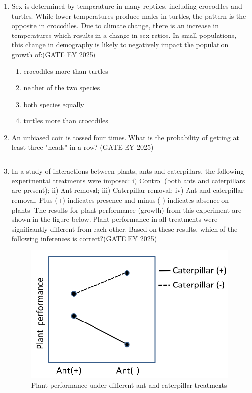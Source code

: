 \begin{enumerate}[leftmargin=*,label=\textbf{Q.\arabic*},resume]
\item Sex is determined by temperature in many reptiles, including crocodiles and turtles. While lower temperatures produce males in turtles, the pattern is the opposite in crocodiles. Due to climate change, there is an increase in temperatures which results in a change in sex ratios. In small populations, this change in demography is likely to negatively impact the population growth of:\hfill {(GATE EY 2025)}
\begin{multicols}{2}
\begin{enumerate}
\item crocodiles more than turtles
\item neither of the two species
\item both species equally
\item turtles more than crocodiles
\end{enumerate}
\end{multicols}

\item An unbiased coin is tossed four times. What is the probability of getting at least three "heads" in a row? \hfill {(GATE EY 2025)}

\rule{4cm}{0.15mm}

\item In a study of interactions between plants, ants and caterpillars, the following experimental treatments were imposed: i) Control (both ants and caterpillars are present); ii) Ant removal; iii) Caterpillar removal; iv) Ant and caterpillar removal. Plus (+) indicates presence and minus (-) indicates absence on plants. The results for plant performance (growth) from this experiment are shown in the figure below. Plant performance in all treatments were significantly different from each other. Based on these results, which of the following inferences is correct?\hfill {(GATE EY 2025)}

\begin{figure}[H]
    \centering
    \includegraphics[width=0.9\columnwidth]{figs/imageQ48.png}
    \caption{Plant performance under different ant and caterpillar treatments}
    \label{fig:q48-performance}
\end{figure}


\end{enumerate}
